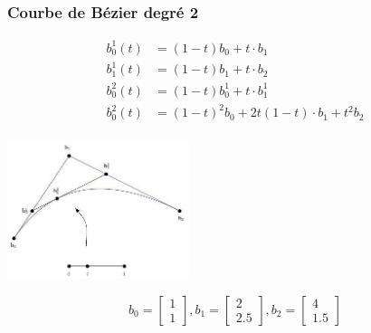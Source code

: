 \documentclass[a4paper,9pt]{extarticle}
\begin{document}
\begin{multicols*}{2}
\subsubsection{Courbe de Bézier degré 2}
\begin{align*}
b_0^1(t) &= (1-t)b_0 + t\cdot b_1\\
b_1^1(t) &= (1-t)b_1 + t\cdot b_2\\
b_0^2(t) &= (1-t)b_0^1 + t\cdot b_1^1\\
b_0^2(t) &= (1-t)^2b_0 + 2t(1-t)\cdot b_1 + t^2b_2\\
\end{align*}
\begin{center}
\includegraphics[width=0.4\textwidth]{img/bezier_1.jpg}\\ 
\end{center}
$$
b_0 = 
\begin{bmatrix}1\\1\end{bmatrix},
b_1 = 
\begin{bmatrix}2\\2.5\end{bmatrix},
b_2 = 
\begin{bmatrix}4\\1.5\end{bmatrix}
$$


\end{multicols*}
\end{document}
